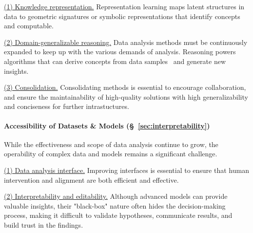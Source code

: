   \underline{(1) Knowledge representation.} Representation learning maps latent structures in data to geometric signatures or symbolic representations that identify concepts~\cite{ahuja2023interventional} and computable.
  
  \underline{(2) Domain-generalizable reasoning.} Data analysis methods must be continuously expanded to keep up with the various demands of analysis. Reasoning powers algorithms that can derive concepts from data samples~\cite{brand2023parameterized} and generate new insights.
  
  \underline{(3) Consolidation.} Consolidating methods is essential to encourage collaboration, and ensure the maintainability of high-quality solutions with high generalizability and conciseness for further intrastuctures.
  
  \paragraph{\textbf{Accessibility of Datasets \& Models (\S~\ref{sec:interpretability})}}
  While the effectiveness and scope of data analysis continue to grow, the operability of complex data and models remains a significant challenge.
  
  \underline{(1) Data analysis interface.} Improving interfaces is essential to ensure that human intervention and alignment are both efficient and effective.
  
  
  \underline{(2) Interpretability and editability.} Although advanced models can provide valuable insights, their "black-box" nature often hides the decision-making process, making it difficult to validate hypotheses, communicate results, and build trust in the findings.
  
